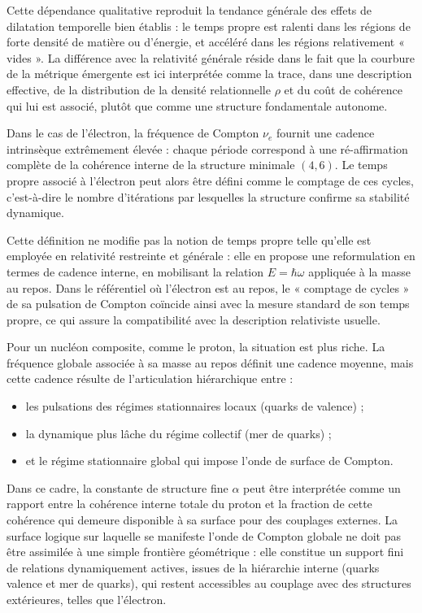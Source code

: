 \documentclass[11pt,a4paper]{article}
\begin{document}
Cette dépendance qualitative reproduit la tendance générale des effets de dilatation temporelle bien établis : le temps propre est ralenti dans les régions de forte densité de matière ou d’énergie, et accéléré dans les régions relativement « vides ». La différence avec la relativité générale réside dans le fait que la courbure de la métrique émergente est ici interprétée comme la trace, dans une description effective, de la distribution de la densité relationnelle \(\rho\) et du coût de cohérence qui lui est associé, plutôt que comme une structure fondamentale autonome.

Dans le cas de l’électron, la fréquence de Compton \(\nu_e\) fournit une cadence intrinsèque extrêmement élevée : chaque période correspond à une ré-affirmation complète de la cohérence interne de la structure minimale \(\left(4,6\right)\). Le temps propre associé à l’électron peut alors être défini comme le comptage de ces cycles, c’est-à-dire le nombre d’itérations par lesquelles la structure confirme sa stabilité dynamique.

Cette définition ne modifie pas la notion de temps propre telle qu’elle est employée en relativité restreinte et générale : elle en propose une reformulation en termes de cadence interne, en mobilisant la relation \(E = \hbar \omega\) appliquée à la masse au repos. Dans le référentiel où l’électron est au repos, le « comptage de cycles » de sa pulsation de Compton coïncide ainsi avec la mesure standard de son temps propre, ce qui assure la compatibilité avec la description relativiste usuelle.

Pour un nucléon composite, comme le proton, la situation est plus riche. La fréquence globale associée à sa masse au repos définit une cadence moyenne, mais cette cadence résulte de l’articulation hiérarchique entre :
\begin{itemize}
  \item les pulsations des régimes stationnaires locaux (quarks de valence) ;
  \item la dynamique plus lâche du régime collectif (mer de quarks) ;
  \item et le régime stationnaire global qui impose l’onde de surface de Compton.
\end{itemize}

Dans ce cadre, la constante de structure fine \(\alpha\) peut être interprétée comme un rapport entre la cohérence interne totale du proton et la fraction de cette cohérence qui demeure disponible à sa surface pour des couplages externes. La surface logique sur laquelle se manifeste l’onde de Compton globale ne doit pas être assimilée à une simple frontière géométrique : elle constitue un support fini de relations dynamiquement actives, issues de la hiérarchie interne (quarks valence et mer de quarks), qui restent accessibles au couplage avec des structures extérieures, telles que l’électron.
\end{document}
